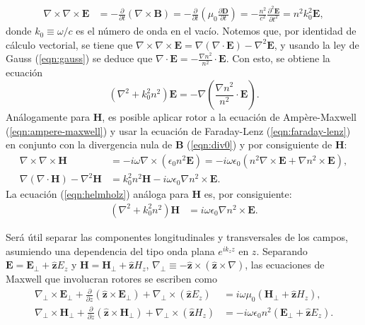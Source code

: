 \begin{align}
	\nabla\times\nabla\times\textbf{E} &= -\frac{\partial}{\partial t}(\nabla\times\textbf{B}) = -\frac{\partial}{\partial t}\left(\mu_0\frac{\partial \textbf{D}}{\partial t}\right) = -\frac{n^2}{c^2}\frac{\partial^2 \textbf{E}}{\partial t^2} = n^2k_0^2 \textbf{E}, \label{eqn:rotordoble}
\end{align}
donde $k_0 \equiv \omega/c$ es el número de onda en el vacío. Notemos que, por identidad de cálculo vectorial, se tiene que $\nabla\times\nabla\times\textbf{E} = \nabla(\nabla\cdot\textbf{E}) - \nabla^2\textbf{E}$, y usando la ley de Gauss (\ref{eqn:gauss}) se deduce que $\nabla\cdot \textbf{E} = -\frac{\nabla n^2}{n^2}\cdot\textbf{E}$. Con esto, se obtiene la ecuación 
\begin{equation}
	\left(\nabla^2  + k_0^2n^2\right)\textbf{E} = -\nabla\left( \frac{\nabla n^2}{n^2} \cdot \textbf{E}  \right). \label{eqn:helmholz}
\end{equation}
Análogamente para \textbf{H}, es posible aplicar rotor a la ecuación de Ampère-Maxwell (\ref{eqn:ampere-maxwell}) y usar la ecuación de Faraday-Lenz (\ref{eqn:faraday-lenz}) en conjunto con la divergencia nula de \textbf{B} (\ref{eqn:div0}) y por consiguiente de \textbf{H}:
\begin{align}
	\nabla\times\nabla\times \textbf{H} &= -i \omega \nabla\times\left(\epsilon_0 n^2 \textbf{E}\right) = -i\omega \epsilon_0  \left(n^2 \nabla\times \textbf{E} + \nabla n^2 \times \textbf{E}\right),
	\nonumber
	\\
	\nabla\left( {\nabla\cdot \textbf{H}} \right)- \nabla^2 \textbf{H}
	&= 
	  k_0^2 n^2\textbf{H} - i\omega \epsilon_0 \nabla n^2 \times \textbf{E} .
	 	\nonumber
\end{align}
La ecuación (\ref{eqn:helmholz}) análoga para \textbf{H} es, por consiguiente:
\begin{align}
	 \left(\nabla^2  + k_0^2 n^2 \right) \textbf{H} &= i\omega \epsilon_0 \nabla n^2 \times \textbf{E}.
	 \label{eqn:helmholzH}
\end{align}

Será útil separar las componentes longitudinales y transversales de los campos, asumiendo una dependencia del tipo onda plana $e^{ik_z z}$ en $z$. Separando $\textbf{E}=\textbf{E}_\perp +\hat{\textbf{z}} E_z$ y $\textbf{H}=\textbf{H}_\perp +\hat{\textbf{z}} H_z$, $\nabla_\perp \equiv - \hat{\textbf{z}}\times (\hat{\textbf{z}}\times\nabla)   $, las ecuaciones de Maxwell que involucran rotores se escriben como
\begin{align}
	\nabla_\perp \times  \textbf{E}_\perp + \frac{\partial}{\partial z} (\hat{\textbf{z}} \times \textbf{E}_\perp) + \nabla_\perp \times (\hat{\textbf{z}} E_z) &= i\omega\mu_0(\textbf{H}_\perp +\hat{\textbf{z}} H_z),
	\label{eqn:Efield}
	\\
	\nabla_\perp \times  \textbf{H}_\perp + \frac{\partial}{\partial z} (\hat{\textbf{z}} \times \textbf{H}_\perp) + \nabla_\perp \times (\hat{\textbf{z}} H_z) &= -i\omega \epsilon_0 n^2 (\textbf{E}_\perp +\hat{\textbf{z}} E_z).
	\label{eqn:Hfield}
\end{align}

